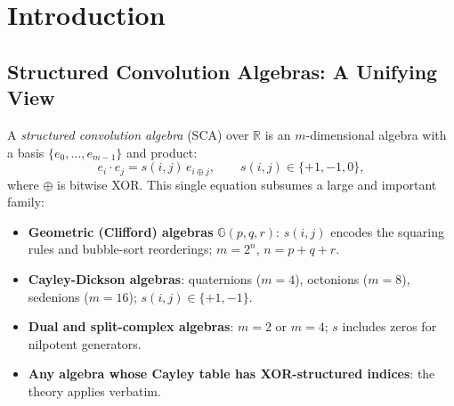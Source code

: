\documentclass[11pt,a4paper]{article}
\theoremstyle{definition}
\theoremstyle{plain}
\theoremstyle{remark}
\newcommand{\GA}{\mathbb{G}}
\newcommand{\reals}{\mathbb{R}}
\begin{document}
\begin{abstract}
\textbf{Empirical summary} (post-place-and-route, Xilinx Artix-7 XC7A35T;
GPU: NVIDIA H100 SXM5):
zero bleed events across $5\times10^6$ adversarial vectors;
error bounds tight to within 5\%;
Hybrid: $5.1\times$ SoA, 185~MHz, 38~DSPs, with formal proof;
GPU: $7.8\times$ float32, 71--83\% PTQ-gap recovery via QAT;
72-bit atomic motor word (one 128-bit AXI/SIMD transaction);
224 joints/ms, $\le3.8\times10^{-5}$~m formally guaranteed position error.

All artefacts (RTL, Lean~4 proofs, Python model, GPU kernels, QAT code,
synthesis scripts) are at
\url{https://github.com/nahhididwin/L-Representation}.
\end{abstract}

\tableofcontents
\newpage

\section{Introduction}
\label{sec:intro}

\subsection{Structured Convolution Algebras: A Unifying View}

A \emph{structured convolution algebra} (SCA) over $\reals$ is an
$m$-dimensional algebra with a basis $\{e_0,\ldots,e_{m-1}\}$ and product:
\begin{equation}\label{eq:sca-prod}
  e_i \cdot e_j = s(i,j)\, e_{i \oplus j},
  \qquad s(i,j)\in\{+1,-1,0\},
\end{equation}
where $\oplus$ is bitwise XOR.
This single equation subsumes a large and important family:

\begin{itemize}
  \item \textbf{Geometric (Clifford) algebras} $\GA(p,q,r)$:
        $s(i,j)$ encodes the squaring rules and bubble-sort reorderings;
        $m=2^n$, $n=p+q+r$.
  \item \textbf{Cayley-Dickson algebras}: quaternions ($m=4$),
        octonions ($m=8$), sedenions ($m=16$); $s(i,j)\in\{+1,-1\}$.
  \item \textbf{Dual and split-complex algebras}: $m=2$ or $m=4$;
        $s$ includes zeros for nilpotent generators.
  \item \textbf{Any algebra whose Cayley table has XOR-structured indices}:
        the theory applies verbatim.
\end{itemize}
\end{document}
